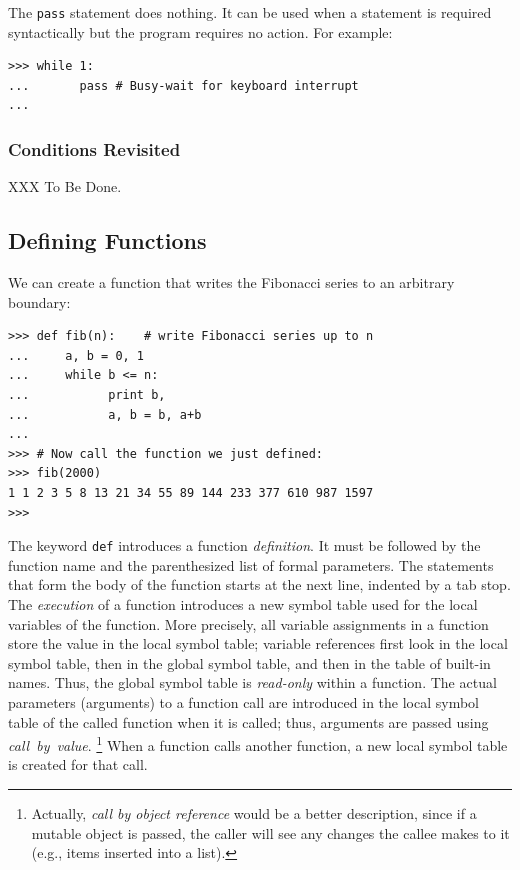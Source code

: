 The {\tt pass} statement does nothing.
It can be used when a statement is required syntactically but the
program requires no action.
For example:
\bcode\begin{verbatim}
>>> while 1:
...       pass # Busy-wait for keyboard interrupt
... 
\end{verbatim}\ecode

\subsubsection{Conditions Revisited}

XXX To Be Done.

\subsection{Defining Functions}

We can create a function that writes the Fibonacci series to an
arbitrary boundary:
\bcode\begin{verbatim}
>>> def fib(n):    # write Fibonacci series up to n
...     a, b = 0, 1
...     while b <= n:
...           print b,
...           a, b = b, a+b
... 
>>> # Now call the function we just defined:
>>> fib(2000)
1 1 2 3 5 8 13 21 34 55 89 144 233 377 610 987 1597
>>> 
\end{verbatim}\ecode
The keyword
{\tt def}
introduces a function
{\em definition}.
It must be followed by the function name and the parenthesized list of
formal parameters.
The statements that form the body of the function starts at the next
line, indented by a tab stop.
The
{\em execution}
of a function introduces a new symbol table used for the local variables
of the function.
More precisely, all variable assignments in a function store the value
in the local symbol table; variable references first look in the local
symbol table, then in the global symbol table, and then in the table of
built-in names.
Thus, the global symbol table is
{\em read-only}
within a function.
The actual parameters (arguments) to a function call are introduced in
the local symbol table of the called function when it is called;
thus, arguments are passed using
{\em call\ by\ value}.%
\footnote{
	 Actually, {\em call  by  object reference} would be a better
	 description, since if a mutable object is passed, the caller
	 will see any changes the callee makes to it (e.g., items
	 inserted into a list).
}
When a function calls another function, a new local symbol table is
created for that call.


